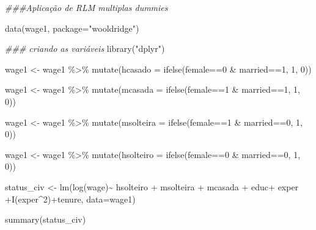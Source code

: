 \documentclass[
  letterpaper,
  DIV=11,
  numbers=noendperiod]{scrreprt}
\newenvironment{Shaded}{\begin{snugshade}}{\end{snugshade}}
\newcommand{\AttributeTok}[1]{\textcolor[rgb]{0.40,0.45,0.13}{#1}}
\newcommand{\DecValTok}[1]{\textcolor[rgb]{0.68,0.00,0.00}{#1}}
\newcommand{\DocumentationTok}[1]{\textcolor[rgb]{0.37,0.37,0.37}{\textit{#1}}}
\newcommand{\FunctionTok}[1]{\textcolor[rgb]{0.28,0.35,0.67}{#1}}
\newcommand{\NormalTok}[1]{\textcolor[rgb]{0.00,0.23,0.31}{#1}}
\newcommand{\OtherTok}[1]{\textcolor[rgb]{0.00,0.23,0.31}{#1}}
\newcommand{\SpecialCharTok}[1]{\textcolor[rgb]{0.37,0.37,0.37}{#1}}
\newcommand{\StringTok}[1]{\textcolor[rgb]{0.13,0.47,0.30}{#1}}
\begin{document}
\begin{Shaded}
\begin{Highlighting}[]
\DocumentationTok{\#\#\#Aplicação de RLM multiplas dummies}

\FunctionTok{data}\NormalTok{(wage1, }\AttributeTok{package=}\StringTok{"wooldridge"}\NormalTok{)}


\DocumentationTok{\#\#\# criando as variáveis}
\FunctionTok{library}\NormalTok{(}\StringTok{"dplyr"}\NormalTok{)}

\NormalTok{wage1 }\OtherTok{\textless{}{-}}\NormalTok{ wage1 }\SpecialCharTok{\%\textgreater{}\%}
  \FunctionTok{mutate}\NormalTok{(}\AttributeTok{hcasado =} \FunctionTok{ifelse}\NormalTok{(female}\SpecialCharTok{==}\DecValTok{0} \SpecialCharTok{\&}\NormalTok{ married}\SpecialCharTok{==}\DecValTok{1}\NormalTok{, }\DecValTok{1}\NormalTok{, }\DecValTok{0}\NormalTok{))}

\NormalTok{wage1 }\OtherTok{\textless{}{-}}\NormalTok{ wage1 }\SpecialCharTok{\%\textgreater{}\%}
  \FunctionTok{mutate}\NormalTok{(}\AttributeTok{mcasada =} \FunctionTok{ifelse}\NormalTok{(female}\SpecialCharTok{==}\DecValTok{1} \SpecialCharTok{\&}\NormalTok{ married}\SpecialCharTok{==}\DecValTok{1}\NormalTok{, }\DecValTok{1}\NormalTok{, }\DecValTok{0}\NormalTok{))}

\NormalTok{wage1 }\OtherTok{\textless{}{-}}\NormalTok{ wage1 }\SpecialCharTok{\%\textgreater{}\%}
  \FunctionTok{mutate}\NormalTok{(}\AttributeTok{msolteira =} \FunctionTok{ifelse}\NormalTok{(female}\SpecialCharTok{==}\DecValTok{1} \SpecialCharTok{\&}\NormalTok{ married}\SpecialCharTok{==}\DecValTok{0}\NormalTok{, }\DecValTok{1}\NormalTok{, }\DecValTok{0}\NormalTok{))}

\NormalTok{wage1 }\OtherTok{\textless{}{-}}\NormalTok{ wage1 }\SpecialCharTok{\%\textgreater{}\%}
  \FunctionTok{mutate}\NormalTok{(}\AttributeTok{hsolteiro =} \FunctionTok{ifelse}\NormalTok{(female}\SpecialCharTok{==}\DecValTok{0} \SpecialCharTok{\&}\NormalTok{ married}\SpecialCharTok{==}\DecValTok{0}\NormalTok{, }\DecValTok{1}\NormalTok{, }\DecValTok{0}\NormalTok{))}


\NormalTok{status\_civ }\OtherTok{\textless{}{-}} \FunctionTok{lm}\NormalTok{(}\FunctionTok{log}\NormalTok{(wage)}\SpecialCharTok{\textasciitilde{}}\NormalTok{  hsolteiro }\SpecialCharTok{+}\NormalTok{ msolteira }\SpecialCharTok{+}\NormalTok{ mcasada }\SpecialCharTok{+}\NormalTok{ educ}\SpecialCharTok{+}\NormalTok{ exper  }\SpecialCharTok{+}\FunctionTok{I}\NormalTok{(exper}\SpecialCharTok{\^{}}\DecValTok{2}\NormalTok{)}\SpecialCharTok{+}\NormalTok{tenure, }\AttributeTok{data=}\NormalTok{wage1)}

\FunctionTok{summary}\NormalTok{(status\_civ)}
\end{Highlighting}
\end{Shaded}
\end{document}
